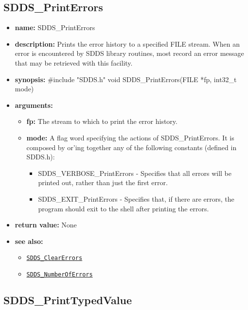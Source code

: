 \documentclass[11pt]{article}
\newcommand{\progref}[1]{\hyperref[SDDS_#1]{\tt SDDS\_#1}}
\begin{document}
\subsection{SDDS\_PrintErrors}
\label{SDDS_PrintErrors}

\begin{itemize}
\item {\bf name:}\newline
SDDS\_PrintErrors
\item {\bf description:}\newline
Prints the error history to a specified FILE stream. When an error is encountered by SDDS library routines, most record an error message that may be retrieved with this facility.
\item {\bf synopsis:} \#include "SDDS.h"\newline
void SDDS\_PrintErrors(FILE *fp, int32\_t mode)
\item {\bf arguments:}
\begin{itemize}
\item {\bf fp:} The stream to which to print the error history.
\item {\bf mode:} A flag word specifying the actions of SDDS\_PrintErrors. It is composed by or'ing together any of the following constants (defined in SDDS.h):
\begin{itemize}
\item SDDS\_VERBOSE\_PrintErrors - Specifies that all errors will be printed out, rather than just the first error.
\item SDDS\_EXIT\_PrintErrors - Specifies that, if there are errors, the program should exit to the shell after printing the errors.
\end{itemize}
\end{itemize}
\item {\bf return value:}\newline
None
\item {\bf see also:}
\begin{itemize}
\item \progref{ClearErrors}
\item \progref{NumberOfErrors}
\end{itemize}
\end{itemize}

\subsection{SDDS\_PrintTypedValue}
\label{SDDS_PrintTypedValue}
\end{document}
